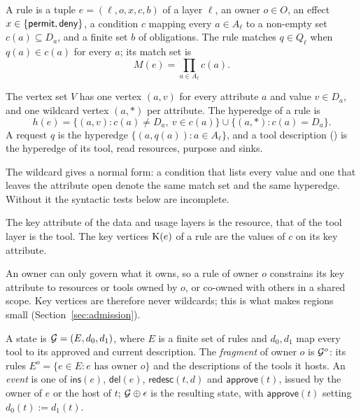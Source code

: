 \begin{definition}[Rule]\label{def:rule}
A rule is a tuple $e = (\ell, o, x, c, b)$ of a layer $\ell$, an owner $o \in O$, an effect $x \in \{\mathsf{permit}, \mathsf{deny}\}$, a condition $c$ mapping every $a \in A_\ell$ to a non-empty set $c(a) \subseteq D_a$, and a finite set $b$ of obligations. The rule matches $q \in Q_\ell$ when $q(a) \in c(a)$ for every $a$; its match set is
\begin{equation}
M(e) = \textstyle\prod_{a \in A_\ell} c(a). \label{eq:matchset}
\end{equation}
\end{definition}

\begin{definition}\label{def:hypergraph}
The vertex set $V$ has one vertex $(a, v)$ for every attribute $a$ and value $v \in D_a$, and one wildcard vertex $(a, \ast)$ per attribute. The hyperedge of a rule is
\[
h(e) = \{(a, v) : c(a) \neq D_a,\ v \in c(a)\} \cup \{(a, \ast) : c(a) = D_a\}.
\]
A request $q$ is the hyperedge $\{(a, q(a)) : a \in A_\ell\}$, and a tool description () is the hyperedge of its tool, read resources, purpose and sinks.
\end{definition}
The wildcard gives a normal form: a condition that lists every value and one that leaves the attribute open denote the same match set and the same hyperedge. Without it the syntactic tests below are incomplete.

\begin{definition}\label{def:key}
The key attribute of the data and usage layers is the resource, that of the tool layer is the tool. The key vertices $\mathrm{K}(e)$ of a rule are the values of $c$ on its key attribute.
\end{definition}
An owner can only govern what it owns, so a rule of owner $o$ constrains its key attribute to resources or tools owned by $o$, or co-owned with others in a shared scope. Key vertices are therefore never wildcards; this is what makes regions small (Section~\ref{sec:admission}).

\begin{definition}\label{def:fdph}
A state is $\mathcal{G} = (E, d_0, d_1)$, where $E$ is a finite set of rules and $d_0, d_1$ map every tool to its approved and current description. The \emph{fragment} of owner $o$ is $\mathcal{G}^o$: its rules $E^o = \{e \in E : e \text{ has owner } o\}$ and the descriptions of the tools it hosts. An \emph{event} is one of $\mathsf{ins}(e)$, $\mathsf{del}(e)$, $\mathsf{redesc}(t, d)$ and $\mathsf{approve}(t)$, issued by the owner of $e$ or the host of $t$; $\mathcal{G} \oplus \epsilon$ is the resulting state, with $\mathsf{approve}(t)$ setting $d_0(t) := d_1(t)$.
\end{definition}

